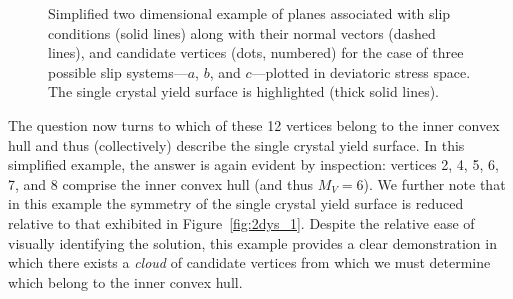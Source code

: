 \documentclass[preprint,3p,times,sort&compress,letterpaper,12pt]{elsarticle} %
\begin{document}
\begin{figure}[H]
    \caption{Simplified two dimensional example of planes associated with slip conditions (solid lines) along with their normal vectors (dashed lines), and candidate vertices (dots, numbered) for the case of three possible slip systems---$a$, $b$, and $c$---plotted in deviatoric stress space. The single crystal yield surface is highlighted (thick solid lines).}
    \label{fig:2dys_2}
\end{figure}

The question now turns to which of these 12 vertices belong to the inner convex hull and thus (collectively) describe the single crystal yield surface. In this simplified example, the answer is again evident by inspection: vertices 2, 4, 5, 6, 7, and 8 comprise the inner convex hull (and thus $M_V = 6$). We further note that in this example the symmetry of the single crystal yield surface is reduced relative to that exhibited in Figure~\ref{fig:2dys_1}. Despite the relative ease of visually identifying the solution, this example provides a clear demonstration in which there exists a \emph{cloud} of candidate vertices from which we must determine which belong to the inner convex hull. 
\end{document}
